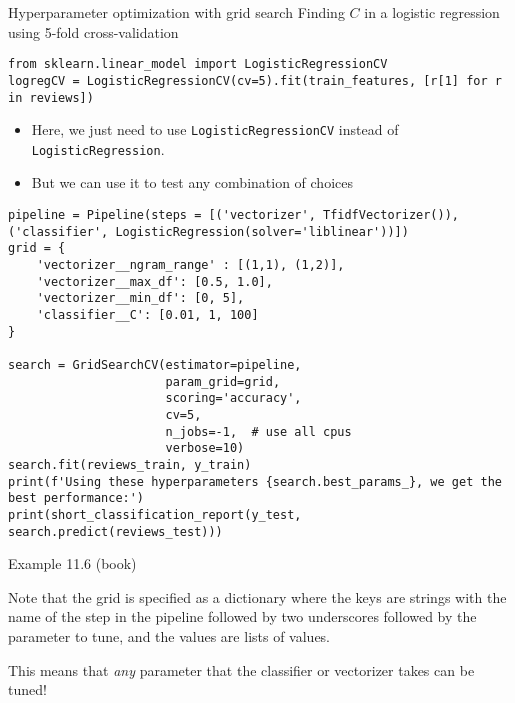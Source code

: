 \begin{frame}[fragile]{Hyperparameter optimization with grid search}
Finding $C$ in a logistic regression using 5-fold cross-validation
\begin{lstlisting}
from sklearn.linear_model import LogisticRegressionCV
logregCV = LogisticRegressionCV(cv=5).fit(train_features, [r[1] for r in reviews])
\end{lstlisting}
\pause 

\begin{itemize}[<+->]
\item Here, we just need to use \texttt{LogisticRegressionCV} instead of \texttt{LogisticRegression}. 
\item But we can use it to test any combination of choices
\end{itemize}
\end{frame}




\begin{frame}
	\small
\begin{verbatim}
pipeline = Pipeline(steps = [('vectorizer', TfidfVectorizer()), ('classifier', LogisticRegression(solver='liblinear'))])
grid = {
    'vectorizer__ngram_range' : [(1,1), (1,2)],
    'vectorizer__max_df': [0.5, 1.0],
    'vectorizer__min_df': [0, 5],
    'classifier__C': [0.01, 1, 100]
}

search = GridSearchCV(estimator=pipeline,
                      param_grid=grid,
                      scoring='accuracy', 
                      cv=5,
                      n_jobs=-1,  # use all cpus
                      verbose=10)
search.fit(reviews_train, y_train)
print(f'Using these hyperparameters {search.best_params_}, we get the best performance:')
print(short_classification_report(y_test, search.predict(reviews_test)))
\end{verbatim}
Example 11.6 (book)
\end{frame}

\begin{frame}[standout]
Note that the grid is specified as a dictionary where the keys are strings with the name of the step in the pipeline followed by two underscores followed by the parameter to tune, and the values are lists of values.

This means that \emph{any} parameter that the classifier or vectorizer takes can be tuned!
\end{frame}



